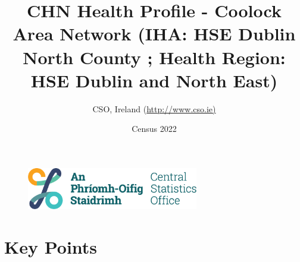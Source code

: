 \documentclass{article}
\title{CHN Health Profile - Coolock Area Network (IHA: HSE Dublin North County ;  Health Region: HSE Dublin and North East) }
\date{Census 2022}
\author{CSO, Ireland  (\url{http://www.cso.ie)}}
\begin{document}


\begin{figure}
	\centering
\includegraphics[width =75mm]{../figures/CSO_Logo.png}
\end{figure}

				 
		   
						  
														  
																																													
												 
			 
\maketitle
					
													   
				 
						 
																																																																											   
				 
				  
  \pagebreak
    	    \tableofcontents

\pagebreak


\section{Key Points}
\end{document}
